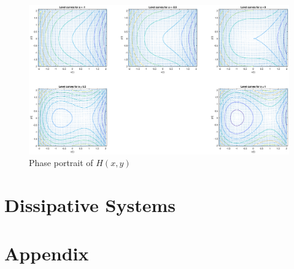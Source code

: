 \documentclass[12pt,1in]{article}
\newenvironment{Example}[2][Example]{\begin{trivlist}
		\item[\hskip \labelsep {\bfseries #1}\hskip \labelsep {\bfseries #2.}]}{\end{trivlist}}
\begin{document}
\begin{Example}{1}
\begin{figure}[H]
	\centering
	\includegraphics[trim={2in 0 1.5in 0}, width=\linewidth]{Figures/hamiltonian}
	\caption{Phase portrait of $H(x,y)$}
	\label{fig:hamiltonian}
\end{figure}



\end{Example}
\section{Dissipative Systems}
\section{Appendix}



\end{document}
